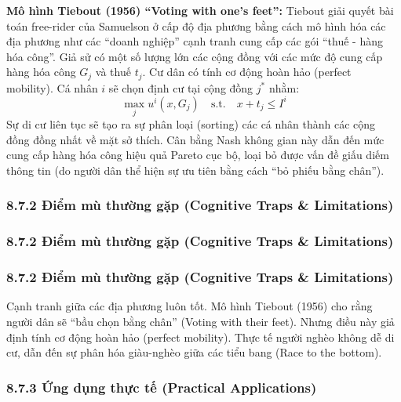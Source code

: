 \documentclass[
]{article}
\begin{document}
\textbf{Mô hình Tiebout (1956) ``Voting with one's feet'':} Tiebout giải
quyết bài toán free-rider của Samuelson ở cấp độ địa phương bằng cách mô
hình hóa các địa phương như các ``doanh nghiệp'' cạnh tranh cung cấp các
gói ``thuế - hàng hóa công''. Giả sử có một số lượng lớn các cộng đồng
với các mức độ cung cấp hàng hóa công \(G_j\) và thuế \(t_j\). Cư dân có
tính cơ động hoàn hảo (perfect mobility). Cá nhân \(i\) sẽ chọn định cư
tại cộng đồng \(j^*\) nhằm:
\[ \max_{j} u^i(x, G_j) \quad \text{s.t.} \quad x + t_j \leq I^i \] Sự
di cư liên tục sẽ tạo ra sự phân loại (sorting) các cá nhân thành các
cộng đồng đồng nhất về mặt sở thích. Cân bằng Nash không gian này dẫn
đến mức cung cấp hàng hóa công hiệu quả Pareto cục bộ, loại bỏ được vấn
đề giấu diếm thông tin (do người dân thể hiện sự ưu tiên bằng cách ``bỏ
phiếu bằng chân'').

\subsubsection{8.7.2 Điểm mù thường gặp (Cognitive Traps \&
Limitations)}\label{ux111iux1ec3m-muxf9-thux1b0ux1eddng-gux1eb7p-cognitive-traps-limitations-66}

\subsubsection{8.7.2 Điểm mù thường gặp (Cognitive Traps \&
Limitations)}\label{ux111iux1ec3m-muxf9-thux1b0ux1eddng-gux1eb7p-cognitive-traps-limitations-67}

\subsubsection{8.7.2 Điểm mù thường gặp (Cognitive Traps \&
Limitations)}\label{ux111iux1ec3m-muxf9-thux1b0ux1eddng-gux1eb7p-cognitive-traps-limitations-68}

Cạnh tranh giữa các địa phương luôn tốt. Mô hình Tiebout (1956) cho rằng
người dân sẽ ``bầu chọn bằng chân'' (Voting with their feet). Nhưng điều
này giả định tính cơ động hoàn hảo (perfect mobility). Thực tế người
nghèo không dễ di cư, dẫn đến sự phân hóa giàu-nghèo giữa các tiểu bang
(Race to the bottom).

\subsubsection{8.7.3 Ứng dụng thực tế (Practical
Applications)}\label{ux1ee9ng-dux1ee5ng-thux1ef1c-tux1ebf-practical-applications-32}
\end{document}

